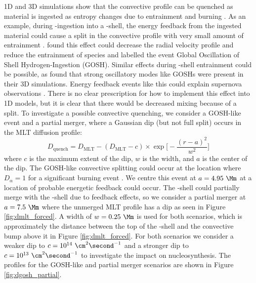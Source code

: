 1D and 3D simulations show that the convective profile can be quenched as material is ingested as entropy changes due to entrainment and burning \citep{ibenThermalPulsesPcapture1975, sackmannCarbonEruptiveStars1974, herwigFormationHydrogendeficientPostAGB1999, millerbertolamiNewEvolutionaryCalculations2006, herwigCONVECTIVEREACTIVEPROTON2011,herwigGLOBALNONSPHERICALOSCILLATIONS2014}.
As an example, during \hydrogen[]-ingestion into a \helium[]-shell, the energy feedback from the ingested material could cause a split in the convective profile with very small amount of entrainment \citep{herwigCONVECTIVEREACTIVEPROTON2011}.
\cite{herwigGLOBALNONSPHERICALOSCILLATIONS2014} found this effect could decrease the radial velocity profile and reduce the entrainment of species and labelled the event Global Oscillation of Shell Hydrogen-Ingestion (GOSH).
Similar effects during \carbon[]-shell entrainment could be possible, as \cite{andrassy3DHydrodynamicSimulations2020} found that strong oscillatory modes like GOSHs were present in their 3D simulations.
Energy feedback events like this could explain supernova observations \citep{smithPREPARINGEXPLOSIONHYDRODYNAMIC2014}.
There is no clear prescription for how to implement this effect into 1D models, but it is clear that there would be decreased mixing because of a split.
To investigate a possible convective quenching, we consider a GOSH-like event and a partial merger, where a Gaussian dip (but not full split) occurs in the MLT diffusion profile:
\begin{equation}
D_{\mathrm{quench}}=D_{\mathrm{MLT}}-(D_{\mathrm{MLT}}-c)\times\exp\Biggl[-\frac{(r-a)^2}{w^2}\Biggr]
\end{equation}
where $c$ is the maximum extent of the dip, $w$ is the width, and $a$ is the center of the dip.
The GOSH-like convective splitting could occur at the location where $D_\alpha=1$ for a significant burning event \citep{herwigCONVECTIVEREACTIVEPROTON2011}. 
We centre this event at $a=4.95~\Mm$ at a location of probable energetic feedback could occur.
The \oxygen[]-shell could partially merge with the \carbon[]-shell due to feedback effects, so we consider a partial merger at $a=7.5~\Mm$ where the unmerged MLT profile has a dip as seen in Figure \ref{fig:dmlt_forced}.
A width of $w=0.25~\Mm$ is used for both scenarios, which is approximately the distance between the top of the \oxygen[]-shell and the convective bump above it in Figure \ref{fig:dmlt_forced}.
For both scenarios we consider a weaker dip to $c=10^{14}~\cm^2\second^{-1}$ and a stronger dip to $c=10^{13}~\cm^2\second^{-1}$ to investigate the impact on nucleosynthesis.
The profiles for the GOSH-like and partial merger scenarios are shown in Figure \ref{fig:dgosh_partial}.

